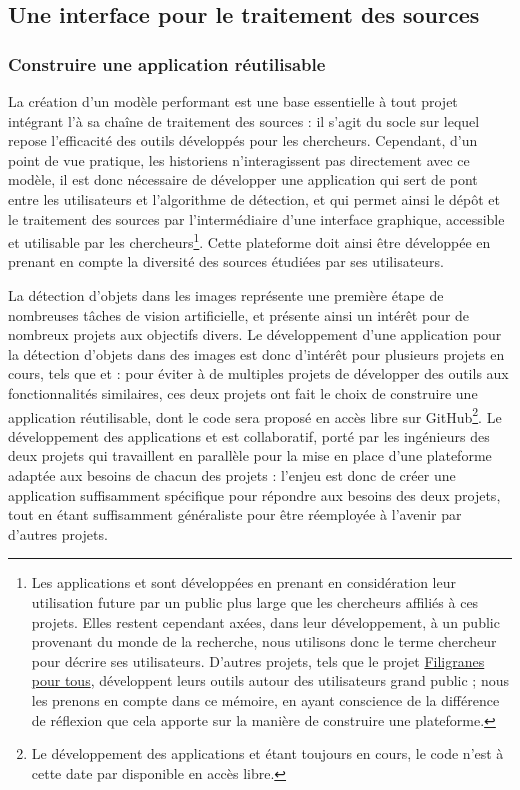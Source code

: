 
\subsection{Une interface pour le traitement des sources}
    \subsubsection{Construire une application réutilisable}
    La création d'un modèle performant est une base essentielle à tout projet intégrant l'\ia à sa chaîne de traitement des sources : il s'agit du socle sur lequel repose l'efficacité des outils développés pour les chercheurs. Cependant, d'un point de vue pratique, les historiens n'interagissent pas directement avec ce modèle, il est donc nécessaire de développer une application qui sert de pont entre les utilisateurs et l'algorithme de détection, et qui permet ainsi le dépôt et le traitement des sources par l'intermédiaire d'une interface graphique, accessible et utilisable par les chercheurs\footnote{Les applications \eida et \vhs sont développées en prenant en considération leur utilisation future par un public plus large que les chercheurs affiliés à ces projets. Elles restent cependant axées, dans leur développement, à un public provenant du monde de la recherche, nous utilisons donc le terme \og chercheur \fg pour décrire ses utilisateurs. D'autres projets, tels que le projet \href{https://filigranes.hypotheses.org/}{Filigranes pour tous}, développent leurs outils autour des utilisateurs grand public ; nous les prenons en compte dans ce mémoire, en ayant conscience de la différence de réflexion que cela apporte sur la manière de construire une plateforme.}. Cette plateforme doit ainsi être développée en prenant en compte la diversité des sources étudiées par ses utilisateurs.
    
    La détection d'objets dans les images représente une première étape de nombreuses tâches de vision artificielle, et présente ainsi un intérêt pour de nombreux projets aux objectifs divers. Le développement d'une application pour la détection d'objets dans des images est donc d'intérêt pour plusieurs projets en cours, tels que \vhs et \eida : pour éviter à de multiples projets de développer des outils aux fonctionnalités similaires, ces deux projets ont fait le choix de construire une application réutilisable, dont le code sera proposé en accès libre sur GitHub\footnote{Le développement des applications \eida et \vhs étant toujours en cours, le code n'est à cette date par disponible en accès libre.}. Le développement des applications \eida et \vhs est collaboratif, porté par les ingénieurs des deux projets qui travaillent en parallèle pour la mise en place d'une plateforme adaptée aux besoins de chacun des projets : l'enjeu est donc de créer une application suffisamment spécifique pour répondre aux besoins des deux projets, tout en étant suffisamment généraliste pour être réemployée à l'avenir par d'autres projets.
    

